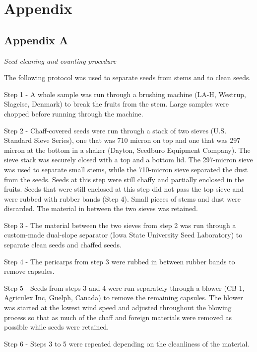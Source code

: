 \documentclass[
]{article}
\begin{document}
\hypertarget{appendix}{%
\section*{Appendix}\label{appendix}}

\hypertarget{appendix-a}{%
\subsection{Appendix A}\label{appendix-a}}

\emph{Seed cleaning and counting procedure}

The following protocol was used to separate seeds from stems and to clean seeds.

Step 1 - A whole sample was run through a brushing machine (LA-H, Westrup, Slageise, Denmark) to break the fruits from the stem. Large samples were chopped before running through the machine.

Step 2 - Chaff-covered seeds were run through a stack of two sieves (U.S. Standard Sieve Series), one that was 710 micron on top and one that was 297 micron at the bottom in a shaker (Dayton, Seedburo Equipment Company). The sieve stack was securely closed with a top and a bottom lid. The 297-micron sieve was used to separate small stems, while the 710-micron sieve separated the dust from the seeds. Seeds at this step were still chaffy and partially enclosed in the fruits. Seeds that were still enclosed at this step did not pass the top sieve and were rubbed with rubber bands (Step 4). Small pieces of stems and dust were discarded. The material in between the two sieves was retained.

Step 3 - The material between the two sieves from step 2 was run through a custom-made dual-slope separator (Iowa State University Seed Laboratory) to separate clean seeds and chaffed seeds.

Step 4 - The pericarps from step 3 were rubbed in between rubber bands to remove capsules.

Step 5 - Seeds from steps 3 and 4 were run separately through a blower (CB-1, Agriculex Inc, Guelph, Canada) to remove the remaining capsules. The blower was started at the lowest wind speed and adjusted throughout the blowing process so that as much of the chaff and foreign materials were removed as possible while seeds were retained.

Step 6 - Steps 3 to 5 were repeated depending on the cleanliness of the material.
\end{document}

